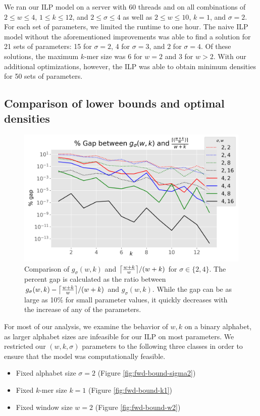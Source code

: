\documentclass{article}
\DeclarePairedDelimiter\ceil{\lceil}{\rceil}
\newcommand{\kmer}{{$k$-mer}}
\begin{document}
We ran our ILP model on a server with 60 threads and on all combinations of $2 \leq w \leq 4$, $1 \leq k \leq 12$, and $2 \leq \sigma \leq 4$ as well as $2 \leq w \leq 10$, $k=1$, and $\sigma=2$. For each set of parameters, we limited the runtime to one hour. The naive ILP model without the aforementioned improvements was able to find a solution for 21 sets of parameters: 15 for $\sigma=2$, 4 for $\sigma=3$, and $2$ for $\sigma=4$. Of these solutions, the maximum \kmer{} size was $6$ for $w=2$ and $3$ for $w> 2$. With our additional optimizations, however, the ILP was able to obtain minimum densities for 50 sets of parameters. 

\subsection{Comparison of lower bounds and optimal densities}
\begin{figure}[ht]
\includegraphics[width=\textwidth]{media/gap-sigma24.png}
\caption{Comparison of $g_\sigma(w, k)$ and ${\ceil*{\frac{w+k}{w}}}/{(w+k)}$ for $\sigma\in\{2,4\}$. The percent gap is calculated as the ratio between $g_\sigma(w, k) - {\ceil*{\frac{w+k}{w}}}/{(w+k)}$ and ${g_\sigma(w,k)}$. While the gap can be as large as 10\% for small parameter values, it quickly decreases with the increase of any of the parameters.}
\label{fig:gap-sigma24}
\end{figure}

For most of our analysis, we examine the behavior of $w,k$ on a binary alphabet, as larger alphabet sizes are infeasible for our ILP on most parameters. We restricted our $(w,k,\sigma)$ parameters to the following three classes in order to ensure that the model was computationally feasible.

\begin{samepage}
\begin{itemize}
    \item Fixed alphabet size $\sigma=2$ (Figure \ref{fig:fwd-bound-sigma2})
    \item Fixed \kmer{} size $k=1$ (Figure \ref{fig:fwd-bound-k1})
    \item Fixed window size $w=2$ (Figure \ref{fig:fwd-bound-w2})
\end{itemize}
\end{samepage}
\end{document}
